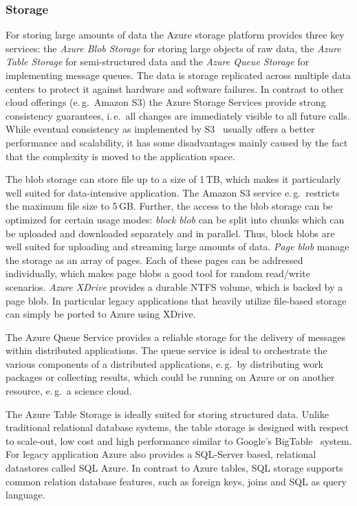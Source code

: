 \documentclass[3p,twocolumn]{elsarticle}
\begin{document}
\subsubsection{Storage}
For storing large amounts of data the Azure storage platform
provides three key services: the \emph{Azure Blob Storage} for storing
large objects of raw data, the \emph{Azure Table Storage} for
semi-structured data and the \emph{Azure Queue Storage} for
implementing message queues.  The data is storage replicated across
multiple data centers to protect it against hardware and software
failures. In contrast to other cloud offerings (e.\,g.\ Amazon S3) the
Azure Storage Services provide strong consistency guarantees, i.\,e.\
all changes are immediately visible to all future calls. While
eventual consistency as implemented by S3~\cite{1294281} usually
offers a better performance and scalability, it has some disadvantages
mainly caused by the fact that the complexity is moved to the
application space.

The blob storage can store file up to a size of 1\,TB, which makes it
particularly well suited for data-intensive application. The Amazon S3
service e.\,g.\ restricts the maximum file size to 5\,GB. Further, the
access to the blob storage can be optimized for certain usage modes:
\emph{block blob} can be split into chunks which can be uploaded and
downloaded separately and in parallel.  Thus, block blobs are well
suited for uploading and streaming large amounts of data. \emph{Page
  blob} manage the storage as an array of pages. Each of these pages
can be addressed individually, which makes page blobs a good tool for
random read/write scenarios. \emph{Azure XDrive} provides a durable
NTFS volume, which is backed by a page blob. In particular legacy
applications that heavily utilize file-based storage can simply be
ported to Azure using XDrive.

The Azure Queue Service provides a reliable storage for the delivery
of messages within distributed applications.  The queue service is
ideal to orchestrate the various components of a distributed
applications, e.\,g.\ by distributing work packages or collecting
results, which could be running on Azure or on another resource,
e.\,g.\ a science cloud.

The Azure Table Storage is ideally suited for storing structured
data. Unlike traditional relational database systems, the table
storage is designed with respect to scale-out, low cost and high
performance similar to Google's BigTable~\cite{bigtable2006}
system. For legacy application Azure also provides a SQL-Server based,
relational datastores called SQL Azure. In contrast to Azure tables,
SQL storage supports common relation database features, such as
foreign keys, joins and SQL as query language.
\end{document}
